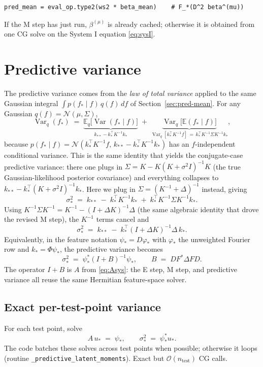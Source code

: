\documentclass{article}
\newcommand{\E}{\mathbb{E}}
\newcommand{\calO}{\mathcal{O}}
\DeclareMathOperator{\Var}{Var}
\begin{document}
\begin{lstlisting}
pred_mean = eval_op.type2(ws2 * beta_mean)    # F_*(D^2 beta^(mu))
\end{lstlisting}

If the M step has just run, $\beta^{(\mu)}$ is already cached; otherwise it is obtained from one CG solve on the System I equation \eqref{eq:sysI}.

\section{Predictive variance}
\label{sec:pred-var}

The predictive variance comes from the \emph{law of total variance} applied to the same Gaussian integral $\int p(f_{*}\mid f)\,q(f)\,df$ of Section~\ref{sec:pred-mean}. For any Gaussian $q(f)=\mathcal{N}(\mu,\Sigma)$,
\begin{equation}
  \Var_{q}(f_{*})
  \;=\;
  \underbrace{\E_{q}\!\bigl[\Var(f_{*}\mid f)\bigr]}_{k_{**}-k_{*}^{\top}K^{-1}k_{*}}
  \;+\;
  \underbrace{\Var_{q}\!\bigl[\E(f_{*}\mid f)\bigr]}_{\Var_{q}[k_{*}^{\top}K^{-1}f]\,=\,k_{*}^{\top}K^{-1}\Sigma K^{-1}k_{*}},
  \label{eq:total-var}
\end{equation}
because $p(f_{*}\mid f)=\mathcal{N}(k_{*}^{\top}K^{-1}f,\,k_{**}-k_{*}^{\top}K^{-1}k_{*})$ has an $f$-independent conditional variance. This is the same identity that yields the conjugate-case predictive variance: there one plugs in $\Sigma=K-K(K+\sigma^{2}I)^{-1}K$ (the true Gaussian-likelihood posterior covariance) and everything collapses to $k_{**}-k_{*}^{\top}(K+\sigma^{2}I)^{-1}k_{*}$. Here we plug in $\Sigma=(K^{-1}+\Delta)^{-1}$ instead, giving
\[
  \sigma_{*}^{2}
  \;=\;
  k_{**} \;-\; k_{*}^{\top}K^{-1}k_{*} \;+\; k_{*}^{\top}K^{-1}\Sigma K^{-1}k_{*}.
\]
Using $K^{-1}\Sigma K^{-1}=K^{-1}-(I+\Delta K)^{-1}\Delta$ (the same algebraic identity that drove the revised M step), the $K^{-1}$ terms cancel and
\[
  \boxed{\;
    \sigma_{*}^{2}
    \;=\;
    k_{**} \;-\; k_{*}^{\top}(I+\Delta K)^{-1}\Delta\,k_{*}.
  \;}
\]
Equivalently, in the feature notation $\psi_{*}=D\varphi_{*}$ with $\varphi_{*}$ the unweighted Fourier row and $k_{*}=\Phi\psi_{*}$, the predictive variance becomes
\[
  \sigma_{*}^{2} \;=\; \psi_{*}^{*}(I+B)^{-1}\psi_{*},
  \qquad B \;=\; D F^{*}\Delta F D.
\]
The operator $I+B$ is $A$ from \eqref{eq:Asys}: the E step, M step, and predictive variance all reuse the same Hermitian feature-space solver.

\subsection{Exact per-test-point variance}
For each test point, solve
\[
  A\,u_{*} \;=\; \psi_{*},
  \qquad
  \sigma_{*}^{2} \;=\; \psi_{*}^{*}u_{*}.
\]
The code batches these solves across test points when possible; otherwise it loops (routine \texttt{\_predictive\_latent\_moments}). Exact but $\calO(n_{\text{test}})$ CG calls.
\end{document}
